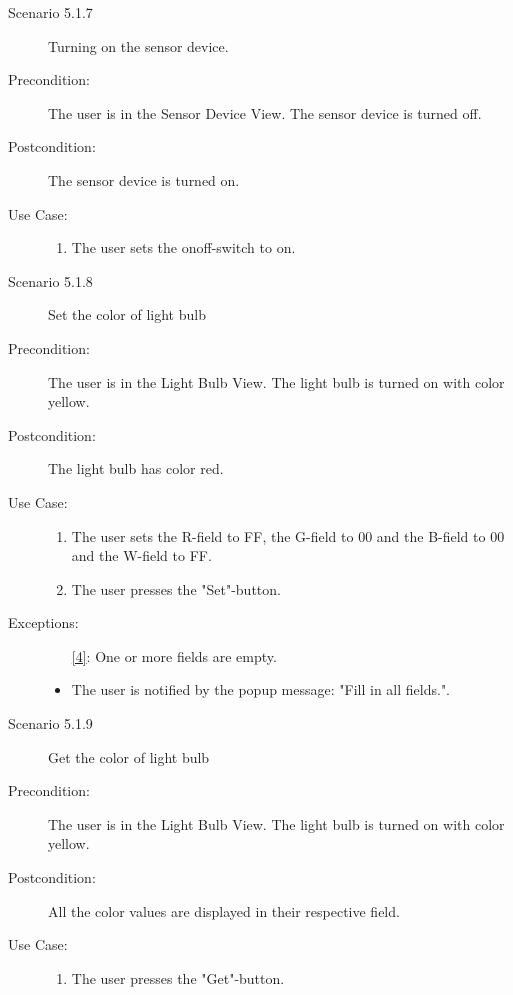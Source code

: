 \documentclass[a4paper]{article}
\begin{document}
\begin{description}
\item[]

\item[Scenario 5.1.7] Turning on the sensor device.
\item[Precondition:] The user is in the Sensor Device View. The sensor device is turned off.
\item[Postcondition:] The sensor device is turned on.
\item[Use Case:]\mbox{}
\begin{enumerate}
\item  The user sets the onoff-switch to on.
\end{enumerate}

\item[]

\item[Scenario 5.1.8] Set the color of light bulb
\item[Precondition:] The user is in the Light Bulb View. The light bulb is turned on with color yellow.
\item[Postcondition:] The light bulb has color red.
\item[Use Case:]\mbox{}
\begin{enumerate}
\item  \label{4} The user sets the R-field to FF, the G-field to 00 and the B-field to 00 and the W-field to FF.
\item The user presses the "Set"-button.

\end{enumerate}

\item[Exceptions:]
\item[]

\begin{itemize}
\item [\ref{4}:] One or more fields are empty.
\item The user is notified by the popup message: "Fill in all fields.".
\end{itemize}

\item[]

\item[Scenario 5.1.9] Get the color of light bulb
\item[Precondition:] The user is in the Light Bulb View. The light bulb is turned on with color yellow.
\item[Postcondition:] All the color values are displayed in their respective field.
\item[Use Case:]\mbox{}
\begin{enumerate}
\item  \label{4} The user presses the "Get"-button.
\end{enumerate}


\end{description}
\end{document}
